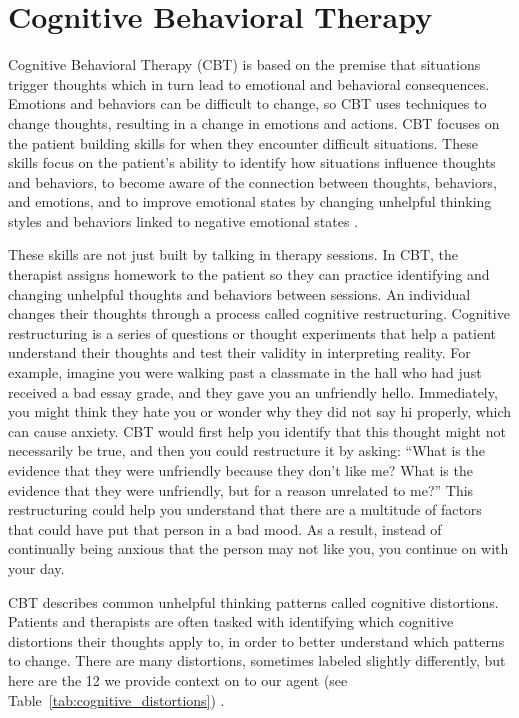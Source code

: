 \documentclass[twoside]{report}
\begin{document}
\section{Cognitive Behavioral Therapy}
Cognitive Behavioral Therapy (CBT) is based on the premise that situations trigger thoughts which in turn lead to emotional and behavioral consequences. Emotions and behaviors can be difficult to change, so CBT uses techniques to change thoughts, resulting in a change in emotions and actions. CBT focuses on the patient building skills for when they encounter difficult situations. These skills focus on the patient's ability to identify how situations influence thoughts and behaviors, to become aware of the connection between thoughts, behaviors, and emotions, and to improve emotional states by changing unhelpful thinking styles and behaviors linked to negative emotional states \cite{va2023cbt}.

These skills are not just built by talking in therapy sessions. In CBT, the therapist assigns homework to the patient so they can practice identifying and changing unhelpful thoughts and behaviors between sessions. An individual changes their thoughts through a process called cognitive restructuring. Cognitive restructuring is a series of questions or thought experiments that help a patient understand their thoughts and test their validity in interpreting reality. For example, imagine you were walking past a classmate in the hall who had just received a bad essay grade, and they gave you an unfriendly hello. Immediately, you might think they hate you or wonder why they did not say hi properly, which can cause anxiety. CBT would first help you identify that this thought might not necessarily be true, and then you could restructure it by asking: ``What is the evidence that they were unfriendly because they don't like me? What is the evidence that they were unfriendly, but for a reason unrelated to me?'' This restructuring could help you understand that there are a multitude of factors that could have put that person in a bad mood. As a result, instead of continually being anxious that the person may not like you, you continue on with your day.

CBT describes common unhelpful thinking patterns called cognitive distortions. Patients and therapists are often tasked with identifying which cognitive distortions their thoughts apply to, in order to better understand which patterns to change. There are many distortions, sometimes labeled slightly differently, but here are the 12 we provide context on to our agent (see Table~\ref{tab:cognitive_distortions}) \cite{beckinstitute2021testing}.
\end{document}
